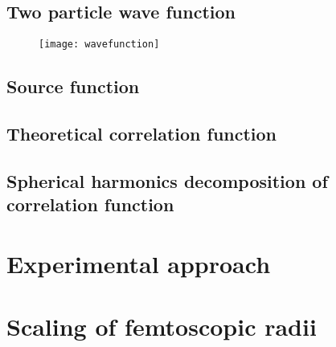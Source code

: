     \subsection{Two particle wave function}
    \begin{figure}[h]
      \centering
      \texttt{[image: wavefunction]}
      \caption{}
      \label{fig:wavefunction}
    \end{figure}
    \subsection{Source function}
    \subsection{Theoretical correlation function}
    \subsection{Spherical harmonics decomposition of correlation function}
  \section{Experimental approach}
  \section{Scaling of femtoscopic radii}
